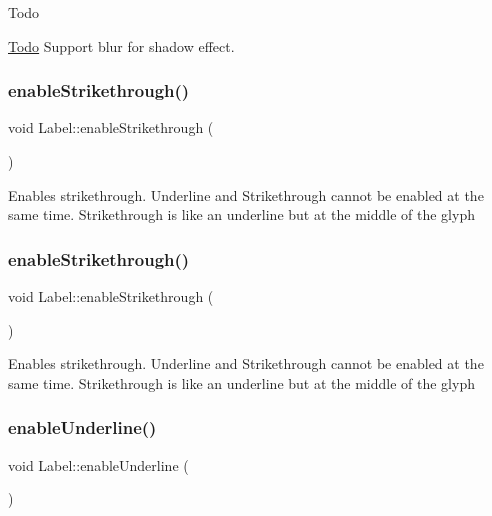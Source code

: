 \begin{DoxyRefDesc}{Todo}
\item[\hyperlink{todo__todo000043}{Todo}]Support blur for shadow effect. \end{DoxyRefDesc}
\mbox{\label{classLabel_accb5df5cb55d97d516d90489aafff1fb}} 
\subsubsection{\texorpdfstring{enable\+Strikethrough()}{enableStrikethrough()}\hspace{0.1cm}{\footnotesize\ttfamily [1/2]}}
{\footnotesize\ttfamily void Label\+::enable\+Strikethrough (\begin{DoxyParamCaption}{ }\end{DoxyParamCaption})}

Enables strikethrough. Underline and Strikethrough cannot be enabled at the same time. Strikethrough is like an underline but at the middle of the glyph \mbox{\label{classLabel_accb5df5cb55d97d516d90489aafff1fb}} 
\subsubsection{\texorpdfstring{enable\+Strikethrough()}{enableStrikethrough()}\hspace{0.1cm}{\footnotesize\ttfamily [2/2]}}
{\footnotesize\ttfamily void Label\+::enable\+Strikethrough (\begin{DoxyParamCaption}{ }\end{DoxyParamCaption})}

Enables strikethrough. Underline and Strikethrough cannot be enabled at the same time. Strikethrough is like an underline but at the middle of the glyph \mbox{\label{classLabel_af8dd37db2a2bf06ef6114ddbcb77845d}} 
\subsubsection{\texorpdfstring{enable\+Underline()}{enableUnderline()}\hspace{0.1cm}{\footnotesize\ttfamily [1/2]}}
{\footnotesize\ttfamily void Label\+::enable\+Underline (\begin{DoxyParamCaption}{ }\end{DoxyParamCaption})}

